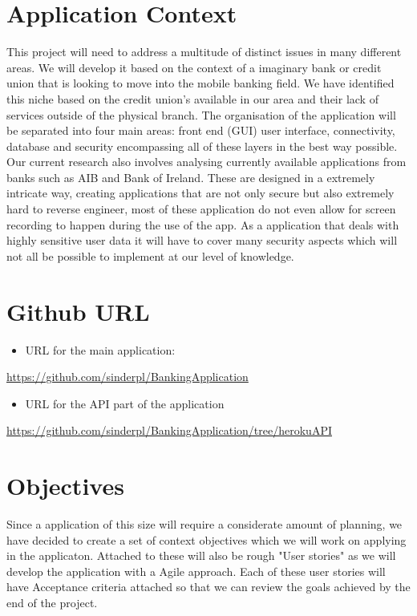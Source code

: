 \section{Application Context}
    This project will need to address a multitude of distinct issues in many different areas. We will develop it based on the context of a imaginary bank or credit union that is looking to move into the mobile banking field. We have identified this niche based on the credit union's available in our area and their lack of services outside of the physical branch.
    The organisation of the application will be separated into four main areas: front end (GUI) user interface, connectivity, database and security encompassing all of these layers in the best way possible.
    Our current research also involves analysing currently available applications from banks such as AIB and Bank of Ireland. These are designed in a extremely intricate way, creating applications that are not only secure but also extremely hard to reverse engineer, most of these application do not even allow for screen recording to happen during the use of the app.
    As a application that deals with highly sensitive user data it will have to cover many security aspects which will not all be possible to implement at our level of knowledge.

\section{Github URL}
    \begin{itemize}
    \item URL for the main application:
    \end{itemize}
    \url{https://github.com/sinderpl/BankingApplication}
    \begin{itemize}
    \item URL for the API part of the application
    \end{itemize}
    \url{https://github.com/sinderpl/BankingApplication/tree/herokuAPI}




\section{Objectives}
    Since a application of this size will require a considerate amount of planning, we have decided to create a set of context objectives which we will work on applying in the applicaton. Attached to these will also be rough "User stories" as we will develop the application with a Agile approach.\cite{userStories} Each of these user stories will have Acceptance criteria attached so that we can review the goals achieved by the end of the project.
